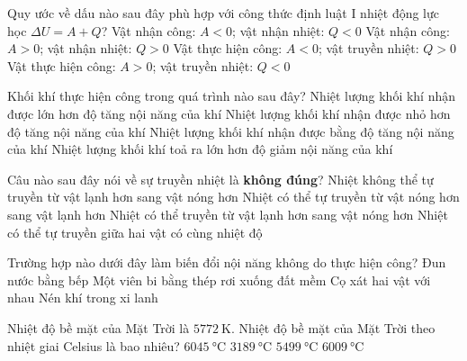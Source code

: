 \begin{ex}
Quy ước về dấu nào sau đây phù hợp với công thức định luật I nhiệt động lực học $\Delta U=A+Q$?	
	\choice
	{Vật nhận công: $A<0$; vật nhận nhiệt: $Q<0$}
	{\True Vật nhận công: $A>0$; vật nhận nhiệt: $Q>0$}
	{Vật thực hiện công: $A<0$; vật truyền nhiệt: $Q>0$}
	{Vật thực hiện công: $A>0$; vật truyền nhiệt: $Q<0$}
	\loigiai{}
\end{ex}
\begin{ex}
Khối khí thực hiện công trong quá trình nào sau đây?	
	\choice
	{\True Nhiệt lượng khối khí nhận được lớn hơn độ tăng nội năng của khí}
	{Nhiệt lượng khối khí nhận được nhỏ hơn độ tăng nội năng của khí}
	{Nhiệt lượng khối khí nhận được bằng độ tăng nội năng của khí}
	{Nhiệt lượng khối khí toả ra lớn hơn độ giảm nội năng của khí}
	\loigiai{}
\end{ex}
\begin{ex}
	Câu nào sau đây nói về sự truyền nhiệt là \textbf{không đúng}?
	\choice
	{Nhiệt không thể tự truyền từ vật lạnh hơn sang vật nóng hơn}
	{Nhiệt có thể tự truyền từ vật nóng hơn sang vật lạnh hơn}
	{Nhiệt có thể truyền từ vật lạnh hơn sang vật nóng hơn}
	{\True Nhiệt có thể tự truyền giữa hai vật có cùng nhiệt độ}
\end{ex}
\begin{ex}
	Trường hợp nào dưới đây làm biến đổi nội năng không do thực hiện công?
	\choice
	{\True Đun nước bằng bếp}
	{Một viên bi bằng thép rơi xuống đất mềm}
	{Cọ xát hai vật với nhau}
	{Nén khí trong xi lanh}
	\loigiai{}
\end{ex}
\begin{ex}
	Nhiệt độ bề mặt của Mặt Trời là $\SI{5772}{\kelvin}$. Nhiệt độ bề mặt của Mặt Trời theo nhiệt giai Celsius là bao nhiêu?
	\choice
	{$\SI{6045}{\celsius}$}
	{$\SI{3189}{\celsius}$}
	{\True $\SI{5499}{\celsius}$}
	{$\SI{6009}{\celsius}$}
\end{ex}
